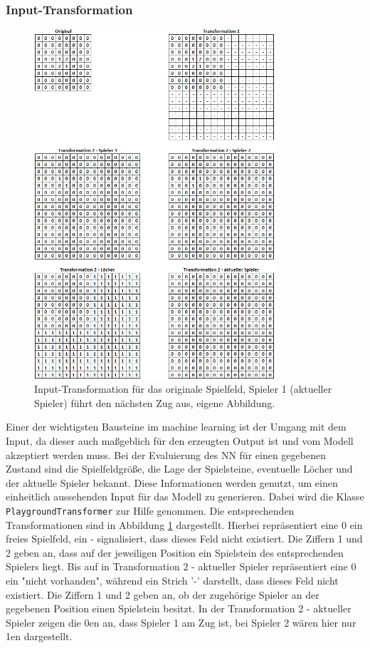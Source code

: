 \documentclass[12pt,a4paper]{article}
\begin{document}
\subsubsection{Input-Transformation}
\begin{figure}
	\centering
	\includegraphics[width=0.8\textwidth]{pics/input_transform.png}	
	\caption{Input-Transformation für das originale Spielfeld, Spieler 1 (aktueller Spieler) führt den nächsten Zug aus, eigene Abbildung.}
	\label{fig:input_transformation}
\end{figure}
Einer der wichtigsten Bausteine im machine learning ist der Umgang mit dem Input, da dieser auch maßgeblich für den erzeugten Output ist und vom Modell akzeptiert werden muss. Bei der Evaluierung des NN für einen gegebenen Zustand sind die Spielfeldgröße, die Lage der Spielsteine, eventuelle Löcher und der aktuelle Spieler bekannt. Diese Informationen werden genutzt, um einen einheitlich aussehenden Input für das Modell zu generieren. Dabei wird die Klasse \texttt{PlaygroundTransformer} zur Hilfe genommen. Die entsprechenden Transformationen sind in Abbildung \ref{fig:input_transformation} dargestellt. Hierbei repräsentiert eine \glqq{}0\grqq{} ein freies Spielfeld, ein \glqq{}-\grqq{} signalisiert, dass dieses Feld nicht existiert. Die Ziffern \glqq{}1\grqq{} und \glqq{}2\grqq{} geben an, dass auf der jeweiligen Position ein Spielstein des entsprechenden Spielers liegt. Bis auf in \glqq Transformation 2 - aktueller Spieler\grqq{} repräsentiert eine 0 ein "nicht vorhanden", während ein Strich '-' darstellt, dass dieses Feld nicht existiert. Die Ziffern 1 und 2 geben an, ob der zugehörige Spieler an der gegebenen Position einen Spielstein besitzt. In der \glqq Transformation 2 - aktueller Spieler\grqq{} zeigen die 0en an, dass Spieler 1 am Zug ist, bei Spieler 2 wären hier nur 1en dargestellt.
\end{document}
